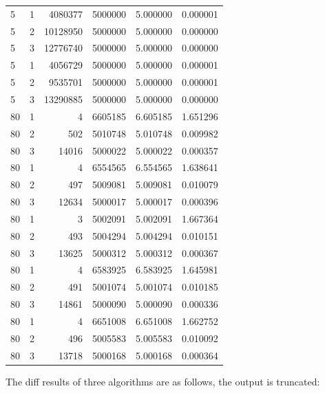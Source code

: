 \documentclass[a4paper,oneside]{book}
\begin{document}
\begin{longtable}[c]{|l|l|r|l|l|l|}
    5        & 1         & 4080377   & 5000000 & 5.000000   & 0.000001 \\
    5        & 2         & 10128950  & 5000000 & 5.000000   & 0.000000 \\
    5        & 3         & 12776740  & 5000000 & 5.000000   & 0.000000 \\
    5        & 1         & 4056729   & 5000000 & 5.000000   & 0.000001 \\
    5        & 2         & 9535701   & 5000000 & 5.000000   & 0.000001 \\
    5        & 3         & 13290885  & 5000000 & 5.000000   & 0.000000 \\
    80       & 1         & 4         & 6605185 & 6.605185   & 1.651296 \\
    80       & 2         & 502       & 5010748 & 5.010748   & 0.009982 \\
    80       & 3         & 14016     & 5000022 & 5.000022   & 0.000357 \\
    80       & 1         & 4         & 6554565 & 6.554565   & 1.638641 \\
    80       & 2         & 497       & 5009081 & 5.009081   & 0.010079 \\
    80       & 3         & 12634     & 5000017 & 5.000017   & 0.000396 \\
    80       & 1         & 3         & 5002091 & 5.002091   & 1.667364 \\
    80       & 2         & 493       & 5004294 & 5.004294   & 0.010151 \\
    80       & 3         & 13625     & 5000312 & 5.000312   & 0.000367 \\
    80       & 1         & 4         & 6583925 & 6.583925   & 1.645981 \\
    80       & 2         & 491       & 5001074 & 5.001074   & 0.010185 \\
    80       & 3         & 14861     & 5000090 & 5.000090   & 0.000336 \\
    80       & 1         & 4         & 6651008 & 6.651008   & 1.662752 \\
    80       & 2         & 496       & 5005583 & 5.005583   & 0.010092 \\
    80       & 3         & 13718     & 5000168 & 5.000168   & 0.000364 \\
\end{longtable}

The diff results of three algorithms are as follows, the output is truncated:
\end{document}
